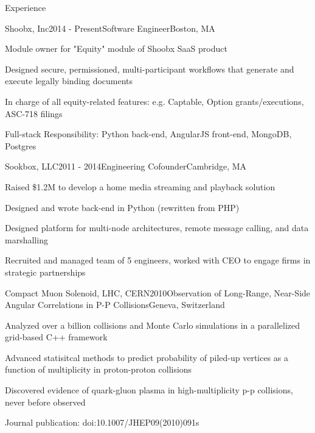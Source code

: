\documentclass{resume}
\begin{document}

\begin{rSection}{Experience}

\begin{rSubsection}{Shoobx, Inc}{2014 - Present}{Software Engineer}{Boston, MA}
\item Module owner for "Equity" module of Shoobx SaaS product
\item Designed secure, permissioned, multi-participant workflows that generate and execute legally binding documents
\item In charge of all equity-related features: e.g. Captable, Option grants/executions, ASC-718 filings
\item Full-stack Responsibility: Python back-end, AngularJS front-end, MongoDB, Postgres
\end{rSubsection}

\begin{rSubsection}{Sookbox, LLC}{2011 - 2014}{Engineering Cofounder}{Cambridge, MA}
\item Raised \$1.2M to develop a home media streaming and playback solution
\item Designed and wrote back-end in Python (rewritten from PHP)
\item Designed platform for multi-node architectures, remote message calling, and data marshalling
\item Recruited and managed team of 5 engineers, worked with CEO to engage firms in strategic partnerships
\end{rSubsection}

\begin{rSubsection}{Compact Muon Solenoid, LHC, CERN}{2010}{Observation of Long-Range, Near-Side Angular Correlations in P-P Collisions}{Geneva, Switzerland}
\item Analyzed over a billion collisions and Monte Carlo simulations in a parallelized grid-based C++ framework
\item Advanced statisitcal methods to predict probability of piled-up vertices as a function of multiplicity in proton-proton collisions
\item Discovered evidence of quark-gluon plasma in high-multiplicity p-p collisions, never before observed
\item Journal publication: doi:10.1007/JHEP09(2010)091s
\end{rSubsection}

\end{rSection}
\end{document}
